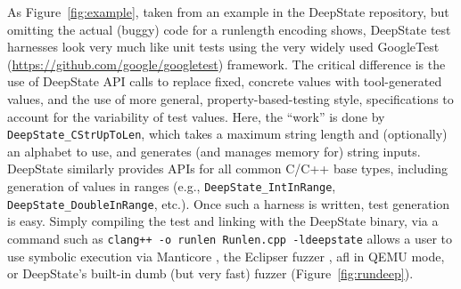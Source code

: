 \documentclass[sigconf]{acmart}
\begin{document}
As Figure~\ref{fig:example}, taken from an example in the DeepState repository, but omitting the actual (buggy) code for a runlength encoding shows, DeepState test harnesses look very much like unit tests using the very widely used GoogleTest (\url{https://github.com/google/googletest}) framework.  The critical difference is the use of DeepState API calls to replace fixed, concrete values with tool-generated values, and the use of more general, property-based-testing style, specifications to account for the variability of test values.  Here, the ``work'' is done by {\tt DeepState\_CStrUpToLen}, which takes a maximum string length and (optionally) an alphabet to use, and generates (and manages memory for) string inputs.  DeepState similarly provides APIs for all common C/C++ base types, including generation of values in ranges (e.g., {\tt DeepState\_IntInRange}, {\tt DeepState\_DoubleInRange}, etc.).
Once such a harness is written, test generation is easy.  Simply compiling the test and linking with the DeepState binary, via a command such as {\tt clang++ -o runlen Runlen.cpp -ldeepstate} allows a user to use symbolic execution via Manticore \cite{mossberg2019manticore}, the Eclipser fuzzer \cite{choi:icse:2019}, afl in QEMU mode, or DeepState's built-in dumb (but very fast) fuzzer (Figure~\ref{fig:rundeep}).
\end{document}

